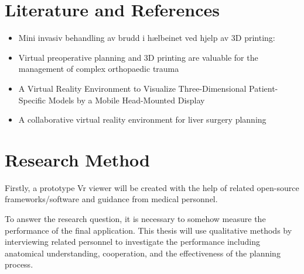 \documentclass[11pt]{scrartcl}
\begin{document}
\section{Literature and References}
\begin{itemize}
\item Mini invasiv behandling av brudd i hælbeinet ved hjelp av 3D printing:


\item Virtual preoperative planning and 3D printing are valuable for the management of complex orthopaedic trauma


\item A Virtual Reality Environment to Visualize Three-Dimensional Patient-Specific Models by a Mobile Head-Mounted Display


\item A collaborative virtual reality environment for liver surgery planning
\end{itemize}

\section{Research Method}
Firstly, a prototype Vr viewer will be created with the help of related
open-source frameworks/software and guidance from medical personnel.

To answer the research question, it is necessary to somehow measure the
performance of the final application. This thesis will use qualitative methods
by interviewing related personnel to investigate the performance including anatomical understanding, cooperation, and the effectiveness of the planning process. 
\end{document}
